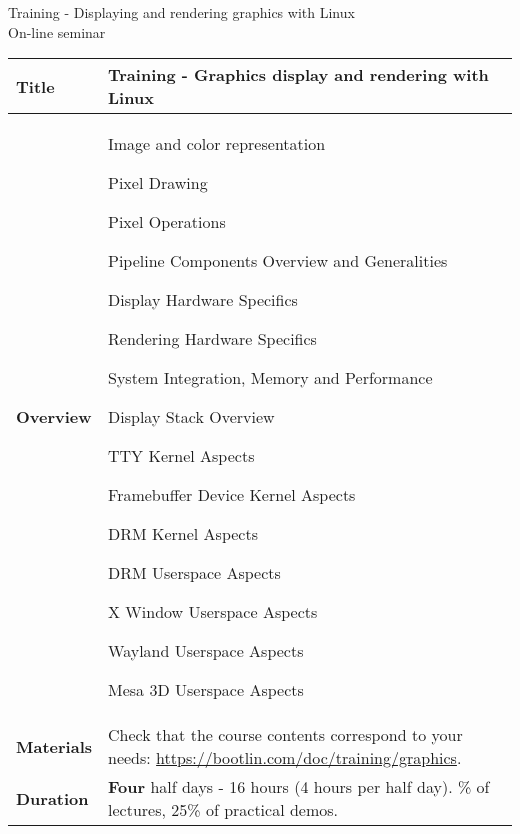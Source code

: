 \documentclass[a4paper,12pt,obeyspaces,spaces,hyphens]{article}
\begin{document}
\thispagestyle{fancy}

\setlength{\arrayrulewidth}{0.8pt}

\begin{center}
\LARGE
Training - Displaying and rendering graphics with Linux\\
\large
On-line seminar
\end{center}

\vspace{1cm}
\small
{}

 {
  \begin{tabularx}{\textwidth}{|g|h|}
    {\bf Title} & {\bf Training - Graphics display and rendering with Linux} \\
    \hline

    {\bf Overview} &
    Image and color representation \par
    Pixel Drawing \par
    Pixel Operations \par
    Pipeline Components Overview and Generalities \par
    Display Hardware Specifics \par
    Rendering Hardware Specifics \par
    System Integration, Memory and Performance \par
    Display Stack Overview \par
    TTY Kernel Aspects \par
    Framebuffer Device Kernel Aspects \par
    DRM Kernel Aspects \par
    DRM Userspace Aspects \par
    X Window Userspace Aspects \par
    Wayland Userspace Aspects \par
    Mesa 3D Userspace Aspects\\
    \hline
    {\bf Materials} &
    Check that the course contents correspond to your needs:
    \newline \url{https://bootlin.com/doc/training/graphics}. \\
    \hline

    {\bf Duration} & {\bf Four} half days - 16 hours (4 hours per half day).
    \% of lectures, 25\% of practical demos. \\
    \hline


\end{tabularx}}
\end{document}
